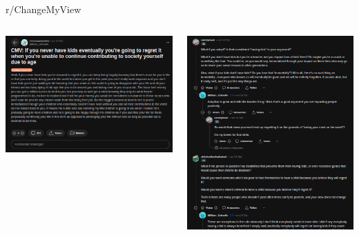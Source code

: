 \documentclass[compress,12pt]{beamer}
\begin{document}
    \begin{frame}{r/ChangeMyView}
        \begin{columns}
            \begin{column}{0.5\textwidth}
                \includegraphics[width=\textwidth]{../images/Screenshot_2024-04-22-15-31-26_1920x1080}
            \end{column}
            \begin{column}{0.5\textwidth}
                \includegraphics[width=\textwidth]{../images/Screenshot_2024-04-22-15-31-26_1920x1080 (1)}
            \end{column}
        \end{columns}
    \end{frame}
\end{document}
